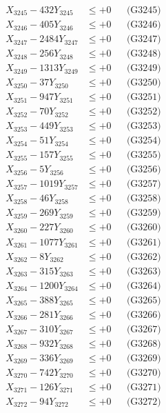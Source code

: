 \documentclass[a4paper,10pt]{article}
\begin{document}
{\begin{align}
X_{3245} - 432Y_{3245} &\leq +0 && \text{(G3245)} \\
X_{3246} - 405Y_{3246} &\leq +0 && \text{(G3246)} \\
X_{3247} - 2484Y_{3247} &\leq +0 && \text{(G3247)} \\
X_{3248} - 256Y_{3248} &\leq +0 && \text{(G3248)} \\
X_{3249} - 1313Y_{3249} &\leq +0 && \text{(G3249)} \\
X_{3250} - 37Y_{3250} &\leq +0 && \text{(G3250)} \\
\allowbreak
X_{3251} - 947Y_{3251} &\leq +0 && \text{(G3251)} \\
X_{3252} - 70Y_{3252} &\leq +0 && \text{(G3252)} \\
X_{3253} - 449Y_{3253} &\leq +0 && \text{(G3253)} \\
X_{3254} - 51Y_{3254} &\leq +0 && \text{(G3254)} \\
X_{3255} - 157Y_{3255} &\leq +0 && \text{(G3255)} \\
X_{3256} - 5Y_{3256} &\leq +0 && \text{(G3256)} \\
X_{3257} - 1019Y_{3257} &\leq +0 && \text{(G3257)} \\
X_{3258} - 46Y_{3258} &\leq +0 && \text{(G3258)} \\
X_{3259} - 269Y_{3259} &\leq +0 && \text{(G3259)} \\
X_{3260} - 227Y_{3260} &\leq +0 && \text{(G3260)} \\
\allowbreak
X_{3261} - 1077Y_{3261} &\leq +0 && \text{(G3261)} \\
X_{3262} - 8Y_{3262} &\leq +0 && \text{(G3262)} \\
X_{3263} - 315Y_{3263} &\leq +0 && \text{(G3263)} \\
X_{3264} - 1200Y_{3264} &\leq +0 && \text{(G3264)} \\
X_{3265} - 388Y_{3265} &\leq +0 && \text{(G3265)} \\
X_{3266} - 281Y_{3266} &\leq +0 && \text{(G3266)} \\
X_{3267} - 310Y_{3267} &\leq +0 && \text{(G3267)} \\
X_{3268} - 932Y_{3268} &\leq +0 && \text{(G3268)} \\
X_{3269} - 336Y_{3269} &\leq +0 && \text{(G3269)} \\
X_{3270} - 742Y_{3270} &\leq +0 && \text{(G3270)} \\
\allowbreak
X_{3271} - 126Y_{3271} &\leq +0 && \text{(G3271)} \\
X_{3272} - 94Y_{3272} &\leq +0 && \text{(G3272)} \\

\end{align}}
\end{document}
